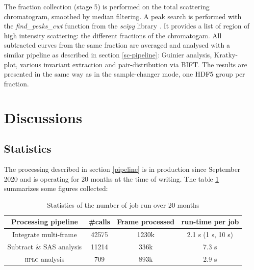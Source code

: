 \documentclass[preprint]{iucr}              %
\begin{document}
The fraction collection (stage 5) is performed on the total scattering chromatogram, smoothed by median filtering. 
A peak search is performed with the \textit{find\_peaks\_cwt} function from the \textit{scipy} library \cite{scipy}.
It provides a list of region of high intensity scattering: the different fractions of the chromatogam.
All subtracted curves from the same fraction are averaged and analysed with a similar pipeline as described in section \ref{sc-pipeline}: Guinier analysis, Kratky-plot, various invariant extraction and pair-distribution via BIFT.
The results are presented in the same way as in the sample-changer mode, one HDF5 group per fraction.

\section{Discussions}

\subsection{Statistics}
The processing described in section \ref{pipeline} is in production since September 2020 and is operating for 20 months at the time of writing.
The table \ref{stats} summarizes some figures collected:
\begin{table}
    \label{stats}
    \caption{Statistics of the number of job run over 20 months}
    \begin{center}
    \begin{tabular}{|c|c|c|c|}
        \hline
        Processing pipeline & \#calls & Frame processed & run-time per job \\
        \hline
        Integrate multi-frame & 42575 & 1230k & 2.1 s (1 s, 10 s) \\
        Subtract \& SAS analysis & 11214 & 336k & 7.3 s \\
        \textsc{hplc} analysis & 709 & 893k & 2.9 s \\
        \hline
    \end{tabular}
    
    \end{center}
\end{table}
\end{document}
